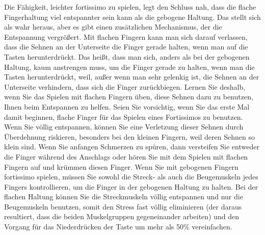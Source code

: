 Die Fähigkeit, leichter fortissimo zu spielen, legt den Schluss nah, dass die flache Fingerhaltung viel entspannter sein kann als die gebogene Haltung.
Das stellt sich als wahr heraus, aber es gibt einen zusätzlichen Mechanismus, der die Entspannung vergrößert.
Mit flachen Fingern kann man sich darauf verlassen, dass die Sehnen an der Unterseite die Finger gerade halten, wenn man auf die Tasten herunterdrückt.
Das heißt, dass man sich, anders als bei der gebogenen Haltung, kaum anstrengen muss, um die Finger gerade zu halten, wenn man die Tasten herunterdrückt, weil, außer wenn man sehr gelenkig ist, die Sehnen an der Unterseite verhindern, dass sich die Finger zurückbiegen.
Lernen Sie deshalb, wenn Sie das Spielen mit flachen Fingern üben, diese Sehnen dazu zu benutzen, Ihnen beim Entspannen zu helfen.
Seien Sie vorsichtig, wenn Sie das erste Mal damit beginnen, flache Finger für das Spielen eines Fortissimos zu benutzen.
Wenn Sie völlig entspannen, können Sie eine Verletzung dieser Sehnen durch Überdehnung riskieren, besonders bei den kleinen Fingern, weil deren Sehnen so klein sind.
Wenn Sie anfangen Schmerzen zu spüren, dann versteifen Sie entweder die Finger während des Anschlags oder hören Sie mit dem Spielen mit flachen Fingern auf und krümmen diesen Finger.
Wenn Sie mit gebogenen Fingern fortissimo spielen, müssen Sie sowohl die Streck- als auch die Beugemuskeln jedes Fingers kontrollieren, um die Finger in der gebogenen Haltung zu halten.
Bei der flachen Haltung können Sie die Streckmuskeln völlig entspannen und nur die Beugemuskeln benutzen, somit den Stress fast völlig eliminieren (der daraus resultiert, dass die beiden Muskelgruppen gegeneinander arbeiten) und den Vorgang für das Niederdrücken der Taste um mehr als 50\% vereinfachen.

